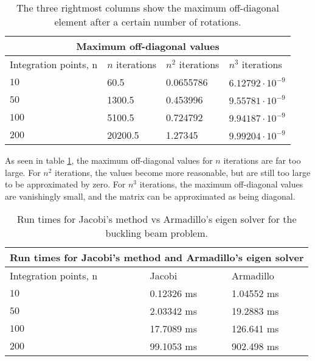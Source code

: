 \documentclass[a4paper,11pt]{article}
\begin{document}
\begin{table}[H]
    \centering
    \begin{tabular}{|p{3cm}||p{2.5cm}|p{2.5cm}|p{2.5cm}|}
    \hline
    \multicolumn{4}{|c|}{Maximum off-diagonal values}\\
    \hline
     Integration points, n & $n$ iterations & $n^2$ iterations & $n^3$ iterations\\
    \hline
     $10$   & 60.5  & 0.0655786 & $6.12792 \cdot 10^{-9}$ \\
     $50$ & 1300.5 & 0.453996 & $9.55781 \cdot 10^{-9}$  \\
     $100$ & 5100.5 & 0.724792 & $9.94187 \cdot 10^{-9}$ \\
     $200$ & 20200.5 & 1.27345 & $9.99204 \cdot 10^{-9}$ \\

    \hline
    \end{tabular}
    \caption{The three rightmost columns show the maximum off-diagonal element after a certain number of rotations.}
    \label{tab:1}
\end{table}

As seen in table \ref{tab:1}, the maximum off-diagonal values for $n$ iterations are far too large. For $n^2$ iterations, the values become more reasonable, but are still too large to be approximated by zero. For $n^3$ iterations, the maximum off-diagonal values are vanishingly small, and the matrix can be approximated as being diagonal. 

\begin{table}[H]
    \centering
    \begin{tabular}{|p{3cm}||p{2.5cm}|p{2.5cm}|}
    \hline
    \multicolumn{3}{|c|}{Run times for Jacobi's method and Armadillo's eigen solver}\\
    \hline
     Integration points, n & Jacobi & Armadillo \\
    \hline
     $10$  & 0.12326 \si{\ms}  & 1.04552 \si{\ms}  \\
     $50$ & 2.03342 \si{\ms} & 19.2883 \si{\ms}  \\
     $100$ & 17.7089 \si{\ms} & 126.641 \si{\ms}  \\
     $200$ & 99.1053 \si{\ms} & 902.498 \si{\ms}  \\

    \hline
    \end{tabular}
    \caption{Run times for Jacobi's method vs Armadillo's eigen solver for the buckling beam problem.}
    \label{tab:2}
\end{table}
\end{document}
